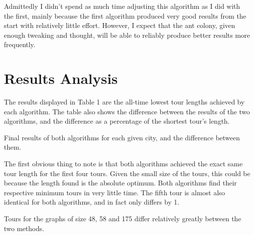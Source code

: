 \documentclass[a4paper,11pt]{article}
\begin{document}
Admittedly I didn't spend as much time adjusting this algorithm as I did with
the first, mainly because the first algorithm produced very good results from
the start with relatively little effort. However, I expect that the ant colony,
given enough tweaking and thought, will be able to reliably produce better
results more frequently.

\section{Results Analysis}
The results displayed in Table 1 are the all-time lowest tour lengths
achieved by each algorithm. The table also shows the difference between the
results of the two algorithms, and the difference as a percentage of the
shortest tour's length.

\begin{table}[h]
\begin{center}

\caption{Final results of both algorithms for each given city, and the
	difference between them.}
\end{center}
\end{table}

The first obvious thing to note is that both algorithms achieved the exact same
tour length for the first four tours. Given the small size of the tours, this
could be because the length found is the absolute optimum. Both algorithms find
their respective minimum tours in very little time. The fifth tour is almost
also identical for both algorithms, and in fact only differs by 1.

Tours for the graphs of size 48, 58 and 175 differ relatively greatly between
the two methods.
\end{document}
